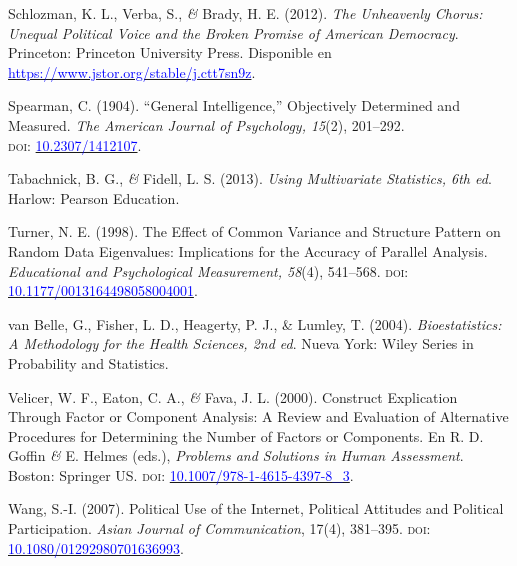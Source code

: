 \documentclass[a4paper]{tufte-handout}
\begin{document}
\begin{list}{}
\item{\small Schlozman, K. L., Verba, S., {\itshape \&} Brady, H. E. (2012). {\itshape The Unheavenly Chorus: Unequal Political Voice and the Broken Promise of American Democracy}. Princeton: Princeton University Press. Disponible en \\ \href{https://www.jstor.org/stable/j.ctt7sn9z}{\textcolor{blue}{https://www.jstor.org/stable/j.ctt7sn9z}}.}

\item{\small Spearman, C. (1904). ``General Intelligence,'' Objectively Determined and Measured. {\itshape The American Journal of Psychology, 15}(2), 201--292. \\ {\scshape doi:} \href{https://doi.org/10.2307/1412107}{\textcolor{blue}{10.2307/1412107}}.}

\item{\small Tabachnick, B. G., {\itshape \&} Fidell, L. S. (2013). {\itshape Using Multivariate Statistics, 6th ed}. Harlow: Pearson Education.}

\item{\small Turner, N. E. (1998). The Effect of Common Variance and Structure Pattern on Random Data Eigenvalues: Implications for the Accuracy of Parallel Analysis. {\itshape Educational and Psychological Measurement, 58}(4), 541--568. {\scshape doi:} \href{https://doi.org/10.1177/0013164498058004001}{\textcolor{blue}{10.1177/0013164498058004001}}.}

\item{\small van Belle, G., Fisher, L. D., Heagerty, P. J., \& Lumley, T. (2004). {\itshape Bioestatistics: A Methodology for the Health Sciences, 2nd ed}. Nueva York: Wiley Series in Probability and Statistics.}

\item{\small Velicer, W. F., Eaton, C. A., {\itshape \&} Fava, J. L. (2000). Construct Explication Through Factor or Component Analysis: A Review and Evaluation of Alternative Procedures for Determining the Number of Factors or Components. En R. D. Goffin {\itshape \&} E. Helmes (eds.), {\itshape Problems and Solutions in Human Assessment}. Boston: Springer US. {\scshape doi:} \href{https://doi.org/10.1007/978-1-4615-4397-8_3}{\textcolor{blue}{10.1007/978-1-4615-4397-8\_3}}.}

\item{\small Wang, S.-I. (2007). Political Use of the Internet, Political Attitudes and Political Participation. {\itshape Asian Journal of Communication}, 17(4), 381--395. {\scshape doi:} \href{https://doi.org/10.1080/01292980701636993}{\textcolor{blue}{10.1080/01292980701636993}}.}

\end{list}
\end{document}
